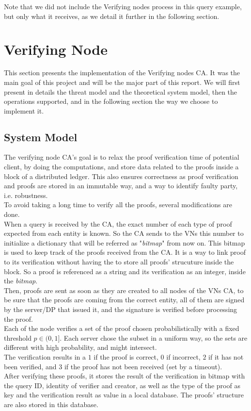 \documentclass{article}
\begin{document}
Note that we did not include the Verifying nodes process in this query example, but only what it receives, as we detail it further in the following section.

\section{Verifying  Node}
This section presents the implementation of the Verifying nodes CA. It was the main goal of this project and will be the major part of this report. We will first present in details the threat model and the theoretical system model, then the operations supported, and in the following section the way we choose to implement it.\\
\subsection{System Model}
The verifying node CA's goal is to relax the proof verification time of potential client, by doing the computations, and store data related to the proofs inside a block of a distributed ledger. This also ensures correctness as proof verification and proofs are stored in an immutable way, and a way to identify faulty party, i.e. robustness.\\
To avoid taking a long time to verify all the proofs, several modifications are done.\\

When a query is received by the CA,  the exact number of each type of proof expected from each entity is known. So the CA sends to the VNs this number to initialize a dictionary that will be referred as "\textit{bitmap}" from now on. This bitmap is used to keep track of the proofs received from the CA. It is a way to link proof to its verification without having the to store all proofs' strucuture inside the block. So a proof is referenced as a string and its verification as an integer, inside the \textit{bitmap}.\\

Then, proofs are sent as soon as they are created to all nodes of the VNs CA, to be sure that the proofs are coming from the correct entity, all of them are signed by the server/DP that issued it, and the signature is verified before processing the proof.\\
Each of the node verifies a set of the proof chosen probabilistically with a fixed threshold $p \in (0,1]$. Each server chose the subset in a uniform way, so the sets are different with high probability, and might intersect.\\
The verification results in a $1$ if the proof is correct, $0$ if incorrect, $2$ if it has not been verified, and 3 if the proof has not been received (set by a timeout).\\
After verifying these proofs, it stores the result of the verification in bitmap with the query ID, identity of verifier and creator, as well as the type of the proof as key and the verification result as value in a local database. The proofs' structure are also stored in this database.\\
\end{document}
